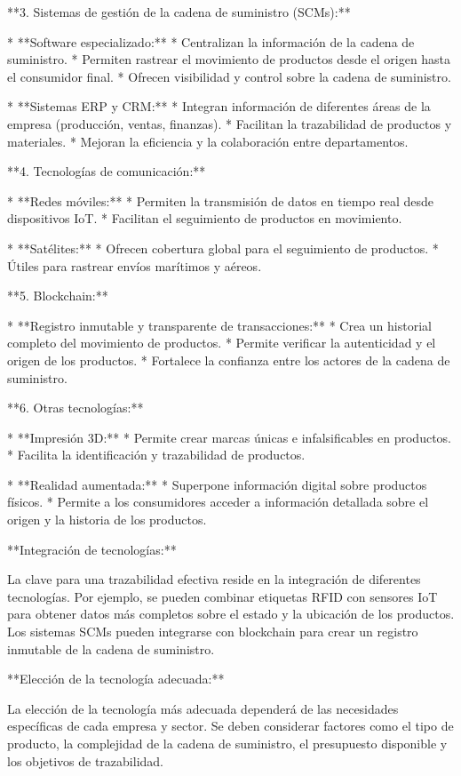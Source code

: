 \documentclass[main.tex]{subfiles}
\begin{document}
**3. Sistemas de gestión de la cadena de suministro (SCMs):**

* **Software especializado:**
    * Centralizan la información de la cadena de suministro.
    * Permiten rastrear el movimiento de productos desde el origen hasta el consumidor final.
    * Ofrecen visibilidad y control sobre la cadena de suministro.

* **Sistemas ERP y CRM:**
    * Integran información de diferentes áreas de la empresa (producción, ventas, finanzas).
    * Facilitan la trazabilidad de productos y materiales.
    * Mejoran la eficiencia y la colaboración entre departamentos.

**4. Tecnologías de comunicación:**

* **Redes móviles:**
    * Permiten la transmisión de datos en tiempo real desde dispositivos IoT.
    * Facilitan el seguimiento de productos en movimiento.

* **Satélites:**
    * Ofrecen cobertura global para el seguimiento de productos.
    * Útiles para rastrear envíos marítimos y aéreos.

**5. Blockchain:**

* **Registro inmutable y transparente de transacciones:**
    * Crea un historial completo del movimiento de productos.
    * Permite verificar la autenticidad y el origen de los productos.
    * Fortalece la confianza entre los actores de la cadena de suministro.

**6. Otras tecnologías:**

* **Impresión 3D:**
    * Permite crear marcas únicas e infalsificables en productos.
    * Facilita la identificación y trazabilidad de productos.

* **Realidad aumentada:**
    * Superpone información digital sobre productos físicos.
    * Permite a los consumidores acceder a información detallada sobre el origen y la historia de los productos.

**Integración de tecnologías:**

La clave para una trazabilidad efectiva reside en la integración de diferentes tecnologías. Por ejemplo, se pueden combinar etiquetas RFID con sensores IoT para obtener datos más completos sobre el estado y la ubicación de los productos. Los sistemas SCMs pueden integrarse con blockchain para crear un registro inmutable de la cadena de suministro.

**Elección de la tecnología adecuada:**

La elección de la tecnología más adecuada dependerá de las necesidades específicas de cada empresa y sector. Se deben considerar factores como el tipo de producto, la complejidad de la cadena de suministro, el presupuesto disponible y los objetivos de trazabilidad.
\end{document}
